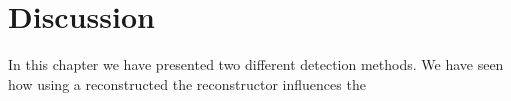 \documentclass[a4paper, openany, oneside]{memoir}
\begin{document}
\section{Discussion}
In this chapter we have presented two different detection methods. We have seen how using a reconstructed  the reconstructor influences the 
\end{document}
